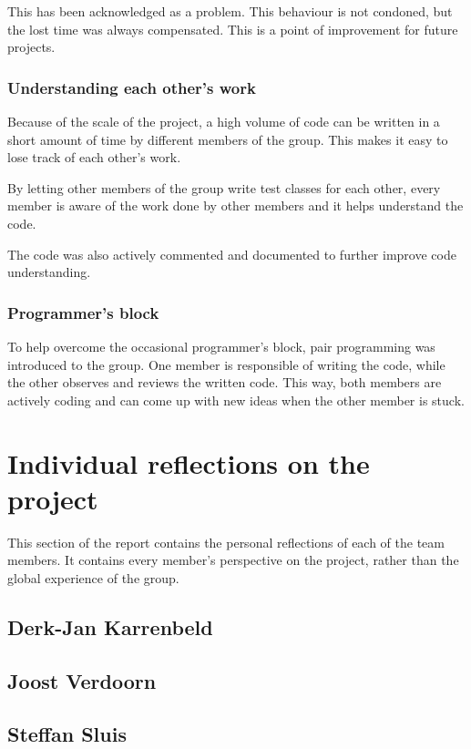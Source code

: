 \documentclass[10pt,a4paper]{report}
\begin{document}
				This has been acknowledged as a problem. This behaviour is not condoned, but the lost time was always compensated. This is a point of improvement for future projects.
			\subsubsection*{Understanding each other's work}
				Because of the scale of the project, a high volume of code can be written in a short amount of time by different members of the group. This makes it easy to lose track of each other's work. 
				
				By letting other members of the group write test classes for each other, every member is aware of the work done by other members and it helps understand the code. 
				
				The code was also actively commented and documented to further improve code understanding.
			\subsubsection*{Programmer's block}
				To help overcome the occasional programmer's block, pair programming was introduced to the group. One member is responsible of writing the code, while the other observes and reviews the written code. This way, both members are actively coding and can come up with new ideas when the other member is stuck.

	\section{Individual reflections on the project}
		This section of the report contains the personal reflections of each of the team members. It contains every member's perspective on the project, rather than the global experience of the group.
		\subsection{Derk-Jan Karrenbeld}
			
			\clearpage
		\subsection{Joost Verdoorn}
			
			\clearpage
		\subsection{Steffan Sluis}
			
			\clearpage
\end{document}

